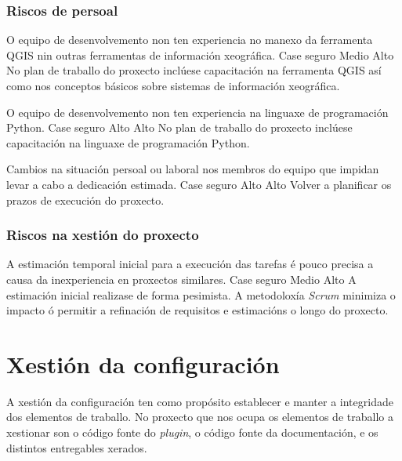 \subsubsection{Riscos de persoal}
		  	{O equipo de desenvolvemento non ten experiencia no manexo da ferramenta QGIS nin outras ferramentas de información xeográfica.}
			{Case seguro} %
			{Medio} %
			{Alto} %
			{No plan de traballo do proxecto inclúese capacitación na ferramenta QGIS así como nos conceptos básicos sobre sistemas de información xeográfica.}

		  	{O equipo de desenvolvemento non ten experiencia na linguaxe de programación Python.}
			{Case seguro} %
			{Alto} %
			{Alto} %
			{No plan de traballo do proxecto inclúese capacitación na linguaxe de programación Python.}
			
		  	{Cambios na situación persoal ou laboral nos membros do equipo que impidan levar a cabo a dedicación estimada.}
			{Case seguro} %
			{Alto} %
			{Alto} %
			{Volver a planificar os prazos de execución do proxecto.}
			
\subsubsection{Riscos na xestión do proxecto}
		  	{A estimación temporal inicial para a execución das tarefas é pouco precisa a causa da inexperiencia en proxectos similares.}
			{Case seguro} %
			{Medio} %
			{Alto} %
			{A estimación inicial realizase de forma pesimista. A metodoloxía \emph{Scrum} minimiza o impacto ó permitir a refinación de requisitos e estimacións o longo do proxecto.}

\section{Xestión da configuración}
A xestión da configuración\cite{GPGC} ten como propósito establecer e manter a integridade dos elementos de traballo. No proxecto que nos ocupa os elementos de traballo a xestionar son o código fonte do \emph{plugin}, o código fonte da documentación, e os distintos entregables xerados.

